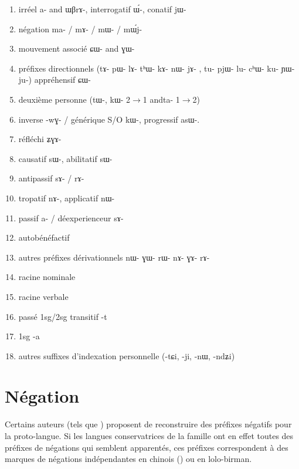 \documentclass[oldfontcommands,oneside,a4paper,11pt]{article}
\newcommand{\ipa}[1]{{\phon \mbox{#1}}} %
\begin{document}
\begin{landscape}
\begin{multicols}{2}
\begin{enumerate}
\item irréel  \ipa{a}- and \ipa{ɯβrɤ}-, interrogatif \ipa{ɯ́}-, conatif \ipa{jɯ}-
\item négation \ipa{ma}- / \ipa{mɤ}- / \ipa{mɯ}- / \ipa{mɯ́j}-
\item  mouvement associé  \ipa{ɕɯ}- and \ipa{ɣɯ}- 
\item préfixes directionnels (\ipa{tɤ}-  \ipa{pɯ}-  \ipa{lɤ}-   \ipa{tʰɯ}-  \ipa{kɤ}-   \ipa{nɯ}-   \ipa{jɤ}- ,  \ipa{tu}-   \ipa{pjɯ}-   \ipa{lu}-   \ipa{cʰɯ}-   \ipa{ku}-   \ipa{ɲɯ}-   \ipa{ju}-)   appréhensif \ipa{ɕɯ}-
\item deuxième personne (\ipa{tɯ}-, \ipa{kɯ}- 2$\rightarrow$1 and\ipa{ta-} 1$\rightarrow$2)
\item inverse -\ipa{wɣ}- / générique S/O \ipa{kɯ}-, progressif \ipa{asɯ}-. 
\item réfléchi \ipa{ʑɣɤ}- 
\item causatif \ipa{sɯ}-, abilitatif \ipa{sɯ}-
\item  antipassif  \ipa{sɤ}- / \ipa{rɤ}-
\item  tropatif \ipa{nɤ}-, applicatif \ipa{nɯ}-
\item passif \ipa{a}- / déexperienceur \ipa{sɤ}-
\item autobénéfactif
\item autres préfixes dérivationnels \ipa{nɯ}- \ipa{ɣɯ}- \ipa{rɯ}- \ipa{nɤ}- \ipa{ɣɤ}- \ipa{rɤ}-
\item racine nominale
\item racine verbale
\item passé 1sg/2sg transitif -\ipa{t} 
\item 1sg -\ipa{a}
\item autres suffixes d'indexation personnelle (-\ipa{tɕi}, -\ipa{ji}, -\ipa{nɯ}, -\ipa{ndʑi})
\end{enumerate}


\end{multicols}
  \end{landscape}

 



\section{Négation} 
Certains auteurs (tels que \citealt{lapolla03}) proposent de reconstruire des préfixes négatifs pour la proto-langue. Si les langues conservatrices de la famille ont en effet toutes des préfixes de négations qui semblent apparentés, ces préfixes correspondent à des marques de négations indépendantes en chinois (\citealt{djamouri91negation}) ou en lolo-birman. 
\end{document}
